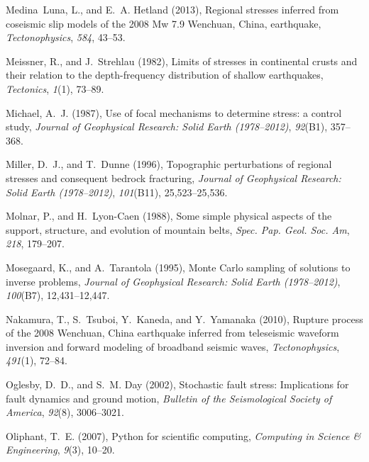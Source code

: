 \documentclass[draft,jgrga]{AGUTeX}
\begin{document}
\begin{article}
\begin{thebibliography}{90}
Medina~Luna, L., and E.~A. Hetland (2013), Regional stresses inferred from
  coseismic slip models of the 2008 {M}w 7.9 {W}enchuan, {C}hina, earthquake,
  \textit{Tectonophysics}, \textit{584}, 43--53.

Meissner, R., and J.~Strehlau (1982), Limits of stresses in continental crusts
  and their relation to the depth-frequency distribution of shallow
  earthquakes, \textit{Tectonics}, \textit{1}(1), 73--89.

Michael, A.~J. (1987), Use of focal mechanisms to determine stress: a control
  study, \textit{Journal of Geophysical Research: Solid Earth (1978--2012)},
  \textit{92}(B1), 357--368.

Miller, D.~J., and T.~Dunne (1996), Topographic perturbations of regional
  stresses and consequent bedrock fracturing, \textit{Journal of Geophysical
  Research: Solid Earth (1978--2012)}, \textit{101}(B11), 25,523--25,536.

Molnar, P., and H.~Lyon-Caen (1988), Some simple physical aspects of the
  support, structure, and evolution of mountain belts, \textit{Spec. Pap. Geol.
  Soc. Am}, \textit{218}, 179--207.

Mosegaard, K., and A.~Tarantola (1995), Monte {C}arlo sampling of solutions to
  inverse problems, \textit{Journal of Geophysical Research: Solid Earth
  (1978--2012)}, \textit{100}(B7), 12,431--12,447.

Nakamura, T., S.~Tsuboi, Y.~Kaneda, and Y.~Yamanaka (2010), Rupture process of
  the 2008 {W}enchuan, {C}hina earthquake inferred from teleseismic waveform
  inversion and forward modeling of broadband seismic waves,
  \textit{Tectonophysics}, \textit{491}(1), 72--84.

Oglesby, D.~D., and S.~M. Day (2002), Stochastic fault stress: {I}mplications
  for fault dynamics and ground motion, \textit{Bulletin of the Seismological
  Society of America}, \textit{92}(8), 3006--3021.

Oliphant, T.~E. (2007), Python for scientific computing, \textit{Computing in
  Science \& Engineering}, \textit{9}(3), 10--20.


\end{thebibliography}
\end{article}
\end{document}
